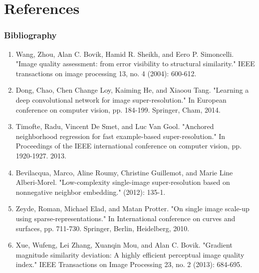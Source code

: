 \documentclass{beamer}
\begin{document}
\section*{References}
\begin{frame}
	\frametitle{Bibliography}
	\tiny{
	\begin{enumerate}
		\item Wang, Zhou, Alan C. Bovik, Hamid R. Sheikh, and Eero P. Simoncelli. "Image quality assessment: from error visibility to structural similarity." IEEE transactions on image processing 13, no. 4 (2004): 600-612.
                \item Dong, Chao, Chen Change Loy, Kaiming He, and Xiaoou Tang. "Learning a deep convolutional network for image super-resolution." In European conference on computer vision, pp. 184-199. Springer, Cham, 2014.
		\item Timofte, Radu, Vincent De Smet, and Luc Van Gool. "Anchored neighborhood regression for fast example-based super-resolution." In Proceedings of the IEEE international conference on computer vision, pp. 1920-1927. 2013.
		\item Bevilacqua, Marco, Aline Roumy, Christine Guillemot, and Marie Line Alberi-Morel. "Low-complexity single-image super-resolution based on nonnegative neighbor embedding." (2012): 135-1.
		\item Zeyde, Roman, Michael Elad, and Matan Protter. "On single image scale-up using sparse-representations." In International conference on curves and surfaces, pp. 711-730. Springer, Berlin, Heidelberg, 2010.
		\item Xue, Wufeng, Lei Zhang, Xuanqin Mou, and Alan C. Bovik. "Gradient magnitude similarity deviation: A highly efficient perceptual image quality index." IEEE Transactions on Image Processing 23, no. 2 (2013): 684-695.
	\end{enumerate}
	}
\end{frame}
\end{document}
